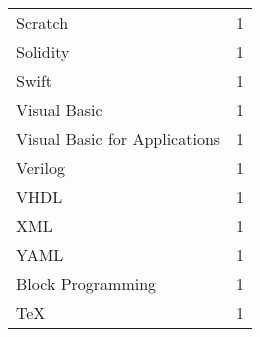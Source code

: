 \begin{table}[ht]
\begin{tabular}{@{}l c@{}}
		Scratch & 1 \\
		Solidity & 1 \\
		Swift & 1 \\
		Visual Basic & 1 \\
		Visual Basic for Applications & 1 \\
		Verilog & 1 \\
		VHDL & 1 \\
		XML & 1 \\
		YAML & 1 \\
		Block Programming & 1 \\
		TeX & 1 \\
	\bottomrule
    \end{tabular}
    \label{tab:languages}
\end{table}